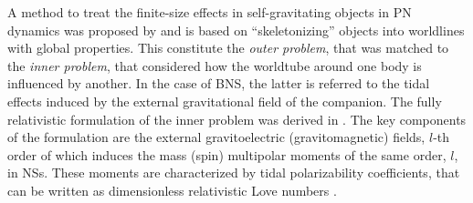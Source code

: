 A method to treat the finite-size effects in self-gravitating objects in \ac{PN} 
dynamics was proposed by \citet{Damour:1983a} and is based on ``skeletonizing'' 
objects into worldlines with global properties. This constitute the \textit{outer problem}, that was matched to the \textit{inner problem}, that considered how the worldtube 
around one body is influenced by another. In the case of \ac{BNS}, the latter is 
referred to the tidal effects induced by the external gravitational field of the companion. 
The fully relativistic formulation of the inner problem was derived in 
\citet{Hinderer:2007mb,Damour:2009vw,Binnington:2009bb}. 
%
%
The key components of the formulation are the external gravitoelectric 
(gravitomagnetic) fields, $l$-th order of which induces the mass (spin) multipolar moments 
of the same order, $l$, in \acp{NS}. These moments are characterized by %
tidal polarizability coefficients, that can be written as dimensionless relativistic 
Love numbers \citep{Damour:2009vw,Binnington:2009bb}.
%
